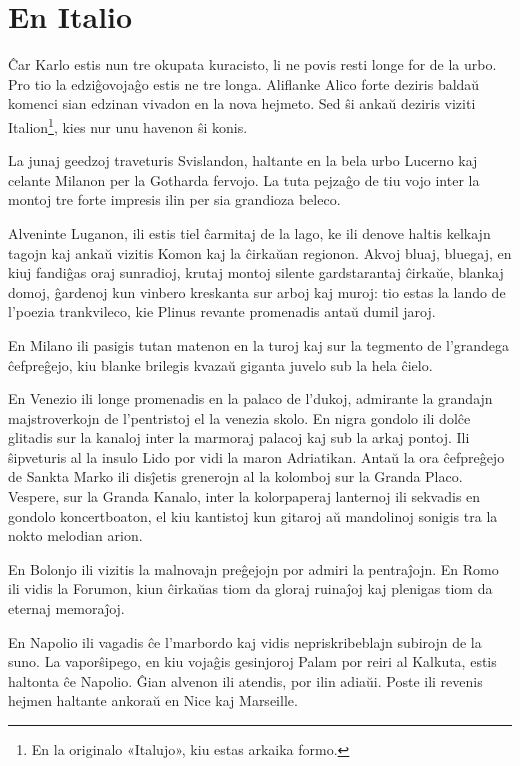 \chapter{En Italio}

Ĉar Karlo estis nun tre okupata kuracisto, li ne povis resti longe for de la urbo. Pro tio la edziĝovojaĝo estis ne tre longa. Aliflanke Alico forte deziris baldaŭ komenci sian edzinan vivadon en la nova hejmeto. Sed ŝi ankaŭ deziris viziti Italion\footnote{En la originalo «Italujo», kiu estas arkaika formo.}, kies nur unu havenon ŝi konis.

La junaj geedzoj traveturis Svislandon, haltante en la bela urbo Lucerno kaj celante Milanon per la Gotharda fervojo. La tuta pejzaĝo de tiu vojo inter la montoj tre forte impresis ilin per sia grandioza beleco.

Alveninte Luganon, ili estis tiel ĉarmitaj de la lago, ke ili denove haltis kelkajn tagojn kaj ankaŭ vizitis Komon kaj la ĉirkaŭan regionon. Akvoj bluaj, bluegaj, en kiuj fandiĝas oraj sunradioj, krutaj montoj silente gardstarantaj ĉirkaŭe, blankaj domoj, ĝardenoj kun vinbero kreskanta sur arboj kaj muroj: tio estas la lando de l'poezia trankvileco, kie Plinus revante promenadis antaŭ dumil jaroj.

En Milano ili pasigis tutan matenon en la turoj kaj sur la tegmento de l'grandega ĉefpreĝejo, kiu blanke brilegis kvazaŭ giganta juvelo sub la hela ĉielo.

En Venezio ili longe promenadis en la palaco de l'dukoj, admirante la grandajn majstroverkojn de l'pentristoj el la venezia skolo. En nigra gondolo ili dolĉe glitadis sur la kanaloj inter la marmoraj palacoj kaj sub la arkaj pontoj. Ili ŝipveturis al la insulo Lido por vidi la maron Adriatikan. Antaŭ la ora ĉefpreĝejo de Sankta Marko ili disĵetis grenerojn al la kolomboj sur la Granda Placo. Vespere, sur la Granda Kanalo, inter la kolorpaperaj lanternoj ili sekvadis en gondolo koncertboaton, el kiu kantistoj kun gitaroj aŭ mandolinoj sonigis tra la nokto melodian arion.

En Bolonjo ili vizitis la malnovajn preĝejojn por admiri la pentraĵojn. En Romo ili vidis la Forumon, kiun ĉirkaŭas tiom da gloraj ruinaĵoj kaj plenigas tiom da eternaj memoraĵoj.

En Napolio ili vagadis ĉe l'marbordo kaj vidis nepriskribeblajn subirojn de la suno. La vaporŝipego, en kiu vojaĝis gesinjoroj Palam por reiri al Kalkuta, estis haltonta ĉe Napolio. Ĝian alvenon ili atendis, por ilin adiaŭi. Poste ili revenis hejmen haltante ankoraŭ en Nice kaj Marseille.

